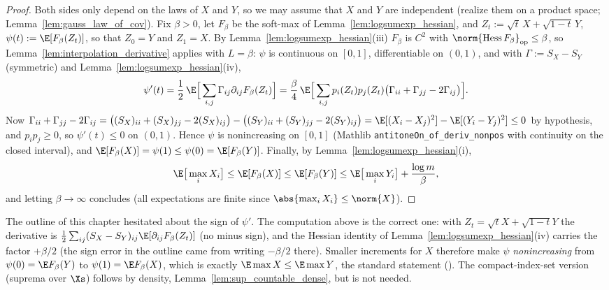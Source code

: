 \begin{proof}
\leanok
{}
Both sides only depend on the laws of $X$ and $Y$, so we may assume that $X$ and $Y$ are
independent (realize them on a product space; Lemma~\ref{lem:gauss_law_of_cov}). Fix
$\beta > 0$, let $F_\beta$ be the soft-max of Lemma~\ref{lem:logsumexp_hessian}, and
$Z_t := \sqrt t\,X + \sqrt{1-t}\,Y$, $\psi(t) := \E[F_\beta(Z_t)]$, so that $Z_0 = Y$ and
$Z_1 = X$. By Lemma~\ref{lem:logsumexp_hessian}(iii) $F_\beta$ is $C^2$ with
$\norm{\mathrm{Hess}\,F_\beta}_{\mathrm{op}}\le\beta$, so Lemma~\ref{lem:interpolation_derivative}
applies with $L = \beta$: $\psi$ is continuous on
$[0,1]$, differentiable on $(0,1)$, and with $\Gamma := S_X - S_Y$ (symmetric) and
Lemma~\ref{lem:logsumexp_hessian}(iv),
\[
  \psi'(t) = \frac12\,\E\Big[\sum_{i,j}\Gamma_{ij}\partial_{ij}F_\beta(Z_t)\Big]
  = \frac{\beta}{4}\,\E\Big[\sum_{i,j}p_i(Z_t)p_j(Z_t)\big(\Gamma_{ii}+\Gamma_{jj}-2\Gamma_{ij}\big)\Big].
\]
Now $\Gamma_{ii}+\Gamma_{jj}-2\Gamma_{ij} = \big((S_X)_{ii}+(S_X)_{jj}-2(S_X)_{ij}\big) - \big((S_Y)_{ii}+(S_Y)_{jj}-2(S_Y)_{ij}\big)
= \E[(X_i-X_j)^2] - \E[(Y_i-Y_j)^2] \le 0$ by hypothesis, and $p_ip_j \ge 0$, so $\psi'(t)\le 0$
on $(0,1)$. Hence $\psi$ is nonincreasing on $[0,1]$ (Mathlib
\texttt{antitoneOn\_of\_deriv\_nonpos} with continuity on the closed interval), and
$\E[F_\beta(X)] = \psi(1) \le \psi(0) = \E[F_\beta(Y)]$. Finally, by
Lemma~\ref{lem:logsumexp_hessian}(i),
\[
  \E\big[\max_iX_i\big] \le \E[F_\beta(X)] \le \E[F_\beta(Y)] \le \E\big[\max_iY_i\big] + \frac{\log m}{\beta},
\]
and letting $\beta\to\infty$ concludes (all expectations are finite since $\abs{\max_iX_i}\le\norm{X}$).
\end{proof}

\begin{remark}\label{rem:psf_sign}
The outline of this chapter hesitated about the sign of $\psi'$. The computation above is the
correct one: with $Z_t = \sqrt t X + \sqrt{1-t}Y$ the derivative is
$\frac12\sum_{ij}(S_X-S_Y)_{ij}\E[\partial_{ij}F_\beta(Z_t)]$ (no minus sign), and the Hessian
identity of Lemma~\ref{lem:logsumexp_hessian}(iv) carries the factor $+\beta/2$ (the sign error in
the outline came from writing $-\beta/2$ there). Smaller increments for $X$ therefore make
$\psi$ \emph{nonincreasing} from $\psi(0) = \E F_\beta(Y)$ to $\psi(1) = \E F_\beta(X)$, which is
exactly $\E\max X\le\E\max Y$, the standard statement (\cite[Theorem~7.2.11]{vershynin2018high}).
The compact-index-set version (suprema over $\Xs$) follows by density,
Lemma~\ref{lem:sup_countable_dense}, but is not needed.
\end{remark}

